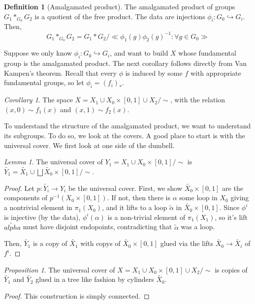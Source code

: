 \documentclass[11pt]{article}
\theoremstyle{definition}
\newtheorem{definition}{Definition}[section]
\theoremstyle{example}
\theoremstyle{remark}
\theoremstyle{lemma}
\newtheorem{lemma}{Lemma}[section]
\theoremstyle{proposition}
\newtheorem{proposition}{Proposition}[section]
\theoremstyle{Problem}
\theoremstyle{Solution}
\theoremstyle{theorem}
\theoremstyle{corollary}
\newtheorem{corollary}{Corollary}[section]
\begin{document}
\begin{definition}[Amalgamated product]
The amalgamated product of groups $G_1 \ast_{G_0} G_2$ is a quotient of the free product.
The data are injections $\phi_i : G_0 \hookrightarrow G_i$. Then,
$$G_1 \ast_{G_0} G_2 = G_1 * G_2 / \ll \phi_1(g)\phi_2(g)^{-1} : \forall g \in G_0\gg$$
\end{definition}
Suppose we only know $\phi_i : G_0 \hookrightarrow G_i$, and want to build $X$ whose fundamental group is the amalgamated product. The next corollary follows directly from Van Kampen's theorem. Recall that every $\phi$ is induced by some $f$ with appropriate fundamental groups, so let $\phi_i = (f_i)_*$.
\begin{corollary}
The space $X = X_1\cup X_0 \times [0,1] \cup X_2/\sim$, with the relation $(x,0) \sim f_1(x)$ and $(x,1) \sim f_2(x)$. 
\end{corollary}
To understand the structure of the amalgamated product, we want to understand its subgroups. To do so, we look at the covers. A good place to start is with the universal cover. We first look at one side of the dumbell.
\begin{lemma}
The universal cover of $Y_1=X_1\cup X_0\times[0,1]/\sim$ is $\widetilde{Y_1} = \widetilde{X_1} \cup \bigsqcup\widetilde{X_0}\times [0,1]/\sim$.
\end{lemma}
\begin{proof}
Let $p:\widetilde{Y_i}\to Y_i$ be the universal cover. First, we show $\widetilde{X_0}\times [0,1]$ are the components of $p^{-1}(X_0\times[0,1])$. If not, then there is $\alpha$ some loop in $X_0$ giving a nontrivial element in $\pi_1(X_0)$, and it lifts to a loop $\tilde{\alpha}$ in $\widetilde{X_0}\times [0,1]$. Since $\phi^i$ is injective (by the data), $\phi^i(\alpha)$ is a non-trivial element of $\pi_1(X_1)$, so it's lift $\tilde{alpha}$ must have disjoint endopoints, contradicting that $\tilde{\alpha}$ was a loop.

Then, $\widetilde{Y_1}$ is a copy of $\widetilde{X_1}$ with copys of $\widetilde{X_0}\times [0,1]$ glued via the lifts $\widetilde{X_0}\to\widetilde{X_i}$ of $f^i$.
\end{proof}
	
\begin{proposition}
The universal cover of $X= X_1\cup X_0 \times [0,1] \cup X_2/\sim$ is copies of $\widetilde{Y_1}$ and $\widetilde{Y_2}$ glued in a tree like fashion by cylinders $\widetilde{X_0}$. 
\end{proposition}
\begin{proof}
This construction is simply connected.
\end{proof}
\end{document}
